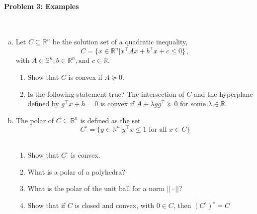 \documentclass[a4paper]{article}
\begin{document}
\paragraph{Problem 3: Examples}
~
\begin{enumerate}[a)]
\item Let $C \subseteq \mathbb{R}^n$ be the solution set of a quadratic inequality,
    \begin{equation}
        C = \{ x\in \mathbb{R}^n | x^\top Ax+b^\top x+c \leq 0\}\,,
    \end{equation}
    with $A \in \mathbb{S}^n, b \in \mathbb{R}^n, \text{and } c \in \mathbb{R}$.

    \noindent
    \begin{enumerate}[1)]
        \item Show that $C$ is convex if $A \succeq 0$.
        \item Is the following statement true? The intersection of $C$ and the hyperplane defined by $g^\top x+h=0$ is convex if $A+\lambda gg^\top \succeq 0$ for some $\lambda \in \mathbb{R}$.
    \end{enumerate}
\item The polar of $C\subseteq \mathbb{R}^n$ is defined as the set
$$C^\circ = \{ y\in \mathbb{R}^n | y^\top x\leq 1 \text{ for all }x \in C\}$$\,
    \noindent
    \begin{enumerate}[1)]
        \item Show that $C^\circ$ is convex.
        \item What is a polar of a polyhedra?
        \item What is the polar of the unit ball for a norm $||\cdot||$?
        \item Show that if $C$ is closed and convex, with $0 \in C$, then $(C^\circ)^\circ = C$
    \end{enumerate}
\end{enumerate}
\end{document}
